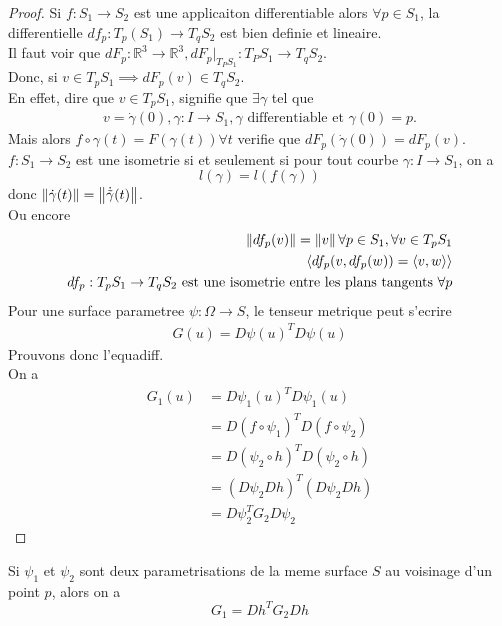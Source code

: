 \documentclass[../main.tex]{subfiles}
\begin{document}
\begin{proof}
Si $f: S_1\to S_2$ est une applicaiton differentiable alors $\forall p \in S_1$, la differentielle $df_p: T_p( S_1)\to T_q S_2$ est bien definie et lineaire.\\
Il faut voir que $dF_p: \mathbb{R}^{3}\to \mathbb{R}^{3}, dF_p|_{T_P S_1} : T_PS_1\to T_qS_2$.\\
Donc, si $v\in T_pS_1 \implies dF_p( v) \in T_qS_2$.\\
En effet, dire que $v\in T_pS_1 $, signifie que $\exists\gamma$ tel que
\begin{align*}
v= \dot\gamma ( 0), \gamma :I\to S_1, \gamma \text{ differentiable et } \gamma( 0) =p.
\end{align*}
Mais alors $f\circ\gamma( t) = F ( \gamma( t) ) \forall t$ verifie que $dF_p( \dot\gamma( 0) ) = dF_p( v) $.\\
$f: S_1\to S_2$ est une isometrie si et seulement si pour tout courbe $\gamma: I \to S_1$, on a 
\[ 
l( \gamma) = l( f( \gamma) ) 
\]
donc $\left\lVert \dot\gamma( t) \right\rVert = \left\lVert \dot { \tilde\gamma} ( t) \right\rVert $.\\
Ou encore
\begin{align*}
\left\lVert df_p( v) \right\rVert = \left\lVert v\right\rVert \forall p \in S_1, \forall v \in T_p S_1\\
\left\langle df_p( v, df_p( w) ) = \left\langle v,w\right\rangle \right\rangle \\
df_p: T_pS_1\to T_q S_2 \text{ est une isometrie entre les plans tangents  } \forall p\\
\end{align*}
Pour une surface parametree $\psi: \Omega \to S$, le tenseur metrique peut s'ecrire
\begin{align*}
G( u) = D\psi( u) ^{T}D\psi( u) 
\end{align*}
Prouvons donc l'equadiff.\\
On a 
\begin{align*}
	G_1( u) &= D\psi_1( u) ^{T}D\psi_1 ( u) \\
	      &= D( f\circ\psi_1)^{T}D( f\circ\psi_2) \\
	      &= D( \psi_2\circ h)^{T}D( \psi_2\circ h) \\
	      &= ( D\psi_2 Dh )^{T}( D\psi_2Dh) \\
	      &= D\psi_2^{T} G_2 D\psi_2
\end{align*}

\end{proof}
\begin{exemple}
	Si $\psi_1$ et $\psi_2$ sont deux parametrisations de la meme surface $S$ au voisinage d'un point $p$, alors on a 
	\[ 
	G_1 = Dh^{T}G_2Dh
	\]
	
\end{exemple}
\end{document}
